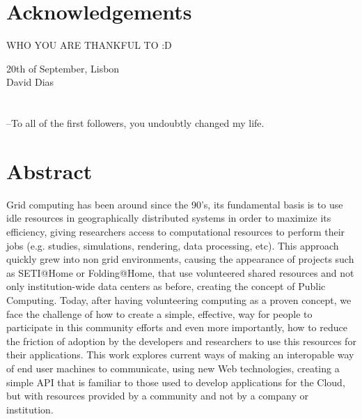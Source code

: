 \chapter*{Acknowledgements}
\thispagestyle{empty}

WHO YOU ARE THANKFUL TO :D

\vspace{15pt}
\vfill
\begin{flushright}
  \begin{minipage}{8cm}
    \begin{center}
    20th of September, Lisbon \\ 
    David Dias
    \end{center}
  \end{minipage}
\end{flushright}

\cleardoublepage

\chapter*{}
\thispagestyle{empty}
\vfill
\mbox{}
\vfill\Large
\begin{flushright}
  \begin{minipage}{8cm}
    \begin{center}

--To all of the first followers, you undoubtly changed my life.

    \end{center}
  \end{minipage}
\end{flushright}
\normalsize\vfill

\cleardoublepage







\chapter*{Abstract}
\thispagestyle{empty}

Grid computing has been around since the 90's, its fundamental basis is to use idle resources in geographically distributed systems in order to maximize its efficiency, giving researchers access to computational resources to perform their jobs (e.g. studies, simulations, rendering, data processing, etc). This approach quickly grew into non grid environments, causing the appearance of projects such as SETI@Home or Folding@Home, that use volunteered shared resources and not only institution-wide data centers as before, creating the concept of Public Computing. Today, after having volunteering computing as a proven concept, we face the challenge of how to create a simple, effective, way for people to participate in this community efforts and even more importantly, how to reduce the friction of adoption by the developers and researchers to use this resources for their applications. This work explores current ways of making an interopable way of end user machines to communicate, using new Web technologies, creating a simple API that is familiar to those used to develop applications for the Cloud, but with resources provided by a community and not by a company or institution.


